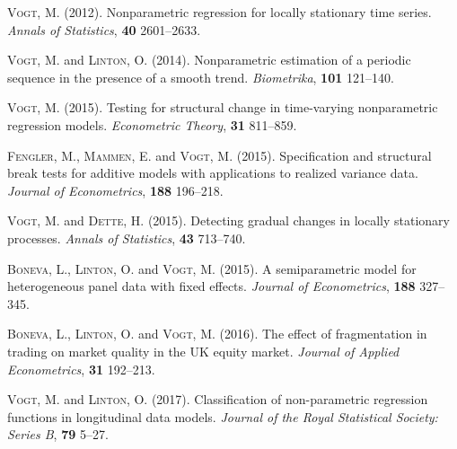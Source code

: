 \documentclass[a4paper,12pt]{article}
\begin{document}
\vspace{0.3cm}

\hangindent=0.5cm \textsc{Vogt, M.} (2012). Nonparametric regression for locally stationary time series. \textit{Annals of Statistics}, \textbf{40} 2601--2633. 

\vspace{0.1cm}

\hangindent=0.5cm \textsc{Vogt, M.} and \textsc{Linton, O.} (2014). Nonparametric estimation of a periodic sequence in the presence of a smooth trend. \textit{Biometrika}, \textbf{101} 121--140.

\vspace{0.1cm}

\hangindent=0.5cm \textsc{Vogt, M.} (2015). Testing for structural change in time-varying nonparametric regression models. \textit{Econometric Theory}, \textbf{31} 811--859.

\vspace{0.1cm}

\hangindent=0.5cm \textsc{Fengler, M.}, \textsc{Mammen, E.} and \textsc{Vogt, M.} (2015). Specification and structural break tests for additive models with applications to realized variance data. \textit{Journal of Econometrics}, \textbf{188} 196--218.

\vspace{0.1cm}

\hangindent=0.5cm \textsc{Vogt, M.} and \textsc{Dette, H.} (2015). Detecting gradual changes in locally stationary processes. \textit{Annals of Statistics}, \textbf{43} 713--740.

\vspace{0.1cm}

\hangindent=0.5cm \textsc{Boneva, L.}, \textsc{Linton, O.} and \textsc{Vogt, M.} (2015). A semiparametric model for heterogeneous panel data with fixed effects. \textit{Journal of Econometrics}, \textbf{188} 327--345.
 
\vspace{0.1cm}

\hangindent=0.5cm \textsc{Boneva, L.}, \textsc{Linton, O.} and \textsc{Vogt, M.} (2016). The effect of fragmentation in trading on market quality in the UK equity market. \textit{Journal of Applied Econometrics}, \textbf{31} 192--213.

\vspace{0.1cm}

\hangindent=0.5cm \textsc{Vogt, M.} and \textsc{Linton, O.} (2017). Classification of non-parametric regression functions in longitudinal data models. \textit{Journal of the Royal Statistical Society: Series B}, \textbf{79} 5--27. 
\end{document}
